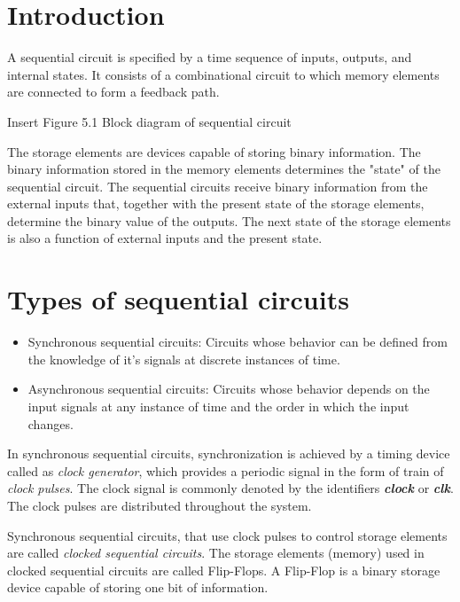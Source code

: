 \section{Introduction}    
A sequential circuit is specified by a time sequence of inputs, outputs, and internal states. It consists of a combinational circuit to which memory elements are connected to form a feedback path.

\begin{highlight}
    Insert Figure 5.1 Block diagram of sequential circuit
\end{highlight}

\par The storage elements are devices capable of storing binary information. The binary information stored in the memory elements determines the "state" of the sequential circuit. The sequential circuits receive binary information from the external inputs that, together with the present state of the storage elements, determine the binary value of the outputs. The next state of the storage elements is also a function of external inputs and the present state. 

\section{Types of sequential circuits}
\begin{itemize}
    \item Synchronous sequential circuits: Circuits whose behavior can be defined from the knowledge of it's signals at discrete instances of time.    
    \item Asynchronous sequential circuits: Circuits whose behavior depends on the input signals at any instance of time and the order 
    in which the input changes.
\end{itemize}

In synchronous sequential circuits, synchronization is achieved by a timing device called as \textit{clock generator}, which provides a periodic signal  in the form of train of \textit{clock pulses}. The clock signal is commonly denoted by the identifiers \textit{\textbf{clock}} or \textit{\textbf{clk}}. The clock pulses are distributed throughout the system.

\par Synchronous sequential circuits, that use clock pulses to control storage elements are called \textit{clocked sequential circuits}. The storage elements (memory) used in clocked sequential circuits are called Flip-Flops. A Flip-Flop is a binary storage device capable of storing one bit of information.

